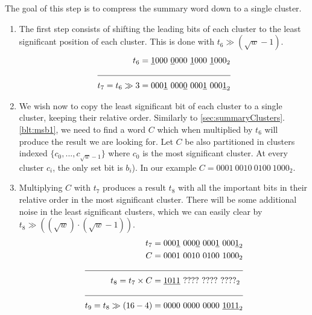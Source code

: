 The goal of this step is to compress the summary word down to a single cluster.

\begin{enumerate}
    \item \label{blt:summCompression1}
    The first step consists of shifting the leading bits of each cluster to the least significant position of each cluster. This is done with $t_6 \gg (\sqrt{w} - 1)$. 
    \begin{align*}
                    t_6 &= \underline{1}000\ \underline{0}000\ \underline{1}000\ \underline{1}000_2 \\ \cline{1-2} 
        t_7 = t_6 \gg 3 &= 000\underline{1}\ 000\underline{0}\ 000\underline{1}\ 000\underline{1}_2
    \end{align*}
    
    \item \label{blt:summCompression2}
    We wish now to copy the least significant bit of each cluster to a single cluster, keeping their relative order.
    Similarly to \ref{sec:summaryClusters}.\ref{blt:msb1}, we need to find a word $C$ which when multiplied by $t_6$ will produce the result we are looking for.
    Let $C$ be also partitioned in clusters indexed $\{c_0, ..., c_{\sqrt{w} - 1}\}$ where $c_0$ is the most significant cluster. At every cluster $c_i$, the only set bit is $b_i$).
    In our example $C = 0001\ 0010\ 0100\ 1000_2$.
    
    \item \label{blt:summCompression3}
    Multiplying $C$ with $t_7$ produces a result $t_8$ with all the important bits in their relative order in the most significant cluster. There will be some additional noise in the least significant clusters, which we can easily clear by $t_8 \gg ((\sqrt{w})\cdot(\sqrt{w} - 1))$.
        \begin{align*}
                         t_7 &= 000\underline{1}\ 000\underline{0}\ 000\underline{1}\ 000\underline{1}_2 \\
                           C &= 0001\ 0010\ 0100\ 1000_2 \\ \cline{1-2} 
          t_8 = t_7 \times C &= \underline{1011}\ ????\ ????\ ????_2\\ \cline{1-2}
        t_9 = t_8 \gg (16-4) &= 0000\ 0000\ 0000\ \underline{1011}_2
    \end{align*}
\end{enumerate}

